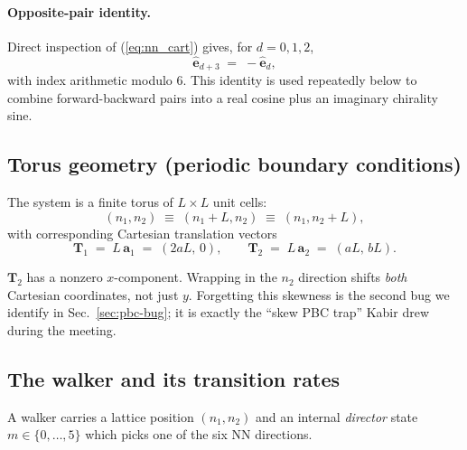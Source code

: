 \documentclass[11pt,a4paper]{article}
\newcommand{\va}[1]{\mathbf{a}_{#1}}
\newcommand{\veps}[1]{\hat{\mathbf{e}}_{#1}}
\newcommand{\vT}[1]{\mathbf{T}_{#1}}
\begin{document}
\paragraph{Opposite-pair identity.} Direct inspection of (\ref{eq:nn_cart}) gives, for $d = 0, 1, 2$,
\begin{equation}\label{eq:opposite_id}
\boxed{\;\; \veps{d+3} \;=\; -\veps{d}, \;\;}
\end{equation}
with index arithmetic modulo $6$. This identity is used repeatedly below
to combine forward-backward pairs into a real cosine plus an imaginary
chirality sine.

\subsection{Torus geometry (periodic boundary conditions)}\label{ssec:torus}

The system is a finite torus of $L \times L$ unit cells:
\begin{equation}\label{eq:torus_id}
(n_1, n_2) \;\equiv\; (n_1 + L, n_2) \;\equiv\; (n_1, n_2 + L),
\end{equation}
with corresponding Cartesian translation vectors
\begin{equation}\label{eq:Tvecs}
\vT{1} \;=\; L\,\va{1} \;=\; (2 a L,\, 0), \qquad
\vT{2} \;=\; L\,\va{2} \;=\; (a L,\, b L).
\end{equation}

\begin{keyresult}
$\vT{2}$ has a nonzero $x$-component. Wrapping in the $n_2$ direction
shifts \emph{both} Cartesian coordinates, not just $y$. Forgetting this
skewness is the second bug we identify in Sec.~\ref{sec:pbc-bug}; it is
exactly the ``skew PBC trap'' Kabir drew during the meeting.
\end{keyresult}

\subsection{The walker and its transition rates}\label{ssec:walker}

A walker carries a lattice position $(n_1, n_2)$ and an internal
\emph{director} state $m \in \{0, \ldots, 5\}$ which picks one of the
six NN directions.
\end{document}
